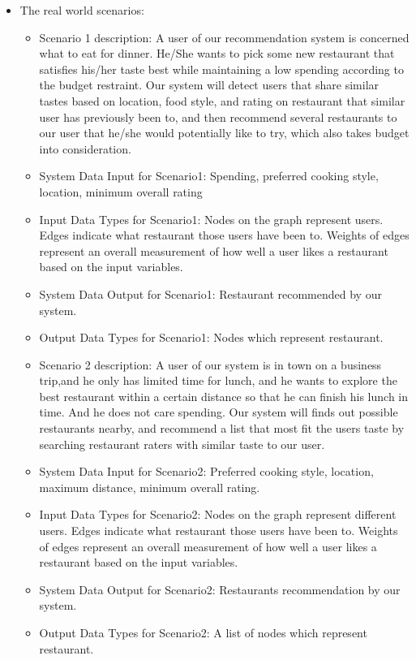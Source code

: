 \begin{itemize}
\item{The real world scenarios: }
	\begin{itemize} 
	\item{Scenario 1 description: }
	A user of our recommendation system is concerned what to eat for dinner. He/She wants to pick some new restaurant that satisfies his/her taste best while maintaining a low spending according to the budget restraint. Our system will detect users that share similar tastes based on location, food style, and rating on restaurant that similar user has previously been to, and then recommend several restaurants to our user that he/she would potentially like to try, which also takes budget into consideration.
	\item{System Data Input for Scenario1: } 
	Spending, preferred cooking style, location, minimum overall rating
	\item{Input Data Types for Scenario1: }
	Nodes on the graph represent users. Edges indicate what restaurant those users have been to.  Weights of edges represent an overall measurement of how well a user likes a restaurant based on the input variables. 
	\item{System Data Output for Scenario1: }
	Restaurant recommended by our system.
	\item{Output Data Types for Scenario1: }
	Nodes which represent restaurant.  
	\item {Scenario 2 description: }
	A user of our system is in town on a business trip,and he only has limited time for lunch, and he wants to explore the best restaurant within a certain distance so that he can finish his lunch in time. And he does not care spending. Our system will finds out possible restaurants nearby, and recommend a list that most fit the users taste by searching restaurant raters with similar taste to our user.
	\item{System Data Input for Scenario2: } 
	Preferred cooking style, location, maximum distance, minimum overall rating.
	\item{Input Data Types for Scenario2: }
	Nodes on the graph represent different users. Edges indicate what restaurant those users have been to.  Weights of edges represent an overall measurement of how well a user likes a restaurant based on the input variables. 
	\item{System Data Output for Scenario2: }
	Restaurants recommendation by our system.
	\item{Output Data Types for Scenario2: }
	A list of nodes which represent restaurant.  
	\end{itemize}


\end{itemize}
